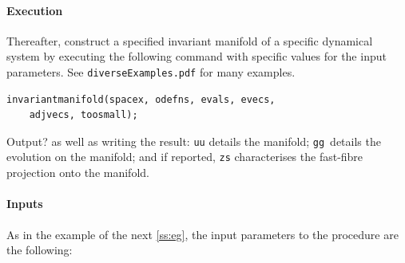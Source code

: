 \documentclass[11pt,a5paper]{article}
\begin{document}
\paragraph{Execution}
Thereafter, construct a specified invariant manifold of a
specific dynamical system by executing the following command
with specific values for the input parameters.  See
\verb|diverseExamples.pdf| for many examples.
\begin{verbatim}
invariantmanifold(spacex, odefns, evals, evecs, 
    adjvecs, toosmall);
\end{verbatim}
Output? as well as writing the result: \verb|uu| details 
the manifold;  \verb|gg|~details the evolution on the manifold; 
and if reported, \verb|zs| characterises the fast-fibre 
projection onto the manifold. 

\paragraph{Inputs}
As in the example of the next \cref{ss:eg}, the input
parameters to the procedure are the following:
\end{document}
